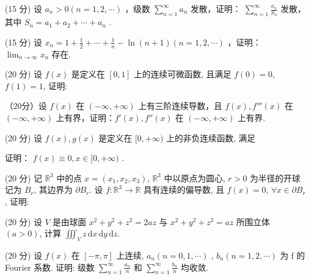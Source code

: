 (15 分) 设  $a_{n} > 0 (n = 1, 2, \cdots)$ ，级数  $\sum_{n=1}^{\infty} a_{n}$  发散，证明： $\sum_{n=1}^{\infty} \frac{a_{n}}{S_{n}}$  发散，其中  $S_{n} = a_{1} + a_{2} + \cdots + a_{n}$ .\par
(15 分) 设  $x_{n}=1+\frac{1}{2}+\cdots+\frac{1}{n}-\ln(n+1)(n=1,2,\cdots)$ ，证明： $\lim_{n\to\infty}x_{n}$  存在.\par
\par{}
(20 分) 设 $f(x)$ 是定义在 $[0,1]$ 上的连续可微函数, 且满足 $f(0) = 0$, $f(1) = 1$, 证明:\par
\nopagebreak[4]
（20分）设 $f(x)$ 在 $(- \infty, + \infty)$ 上有三阶连续导数，且 $f(x), f'''(x)$ 在 $(- \infty, + \infty)$ 上有界，证明：$f'(x), f''(x)$ 在 $(- \infty, + \infty)$ 上有界.\par
\par{}
(20 分) 设 $f(x), g(x)$ 是定义在 $[0, +\infty)$ 上的非负连续函数, 满足\par
\nopagebreak[4]
证明： $f(x) \equiv 0, x \in [0, +\infty)$ .\par
\par{}
(20 分) 记 $\mathbb{R}^3$ 中的点 $x = (x_1, x_2, x_3)$, $\mathbb{R}^3$ 中以原点为圆心, $r > 0$ 为半径的开球记为 $B_r$, 其边界为 $\partial B_r$. 设 $f: \mathbb{R}^3 \to \mathbb{R}$ 具有连续的偏导数, 且 $f(x) = 0$, $\forall x \in \partial B_r$, 证明:\par
\nopagebreak[4]
(20 分) 设 $V$ 是由球面 $x^{2} + y^{2} + z^{2} = 2az$ 与 $x^{2} + y^{2} + z^{2} = az$ 所围立体 $(a > 0)$, 计算 $\iiint_{V} z \, \mathrm{d}x \, \mathrm{d}y \, \mathrm{d}z$.\par
(20 分) 设  $f(x)$  在  $[-\pi , \pi ]$  上连续,  $a_{n} (n = 0, 1, \cdots)$ ,  $b_{n} (n = 1, 2, \cdots)$  为 f 的 Fourier 系数. 证明: 级数  $\sum_{n=1}^{\infty} \frac{a_{n}}{n}$  和  $\sum_{n=1}^{\infty} \frac{b_{n}}{n}$  均收敛.\par
